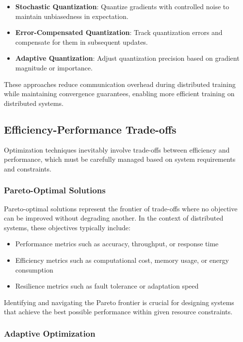 \documentclass{article}
\begin{document}
\begin{itemize}
    \item \textbf{Stochastic Quantization}: Quantize gradients with controlled noise to maintain unbiasedness in expectation.
    
    \item \textbf{Error-Compensated Quantization}: Track quantization errors and compensate for them in subsequent updates.
    
    \item \textbf{Adaptive Quantization}: Adjust quantization precision based on gradient magnitude or importance.
\end{itemize}

These approaches reduce communication overhead during distributed training while maintaining convergence guarantees, enabling more efficient training on distributed systems.

\subsection{Efficiency-Performance Trade-offs}

Optimization techniques inevitably involve trade-offs between efficiency and performance, which must be carefully managed based on system requirements and constraints.

\subsubsection{Pareto-Optimal Solutions}

Pareto-optimal solutions represent the frontier of trade-offs where no objective can be improved without degrading another. In the context of distributed systems, these objectives typically include:

\begin{itemize}
    \item Performance metrics such as accuracy, throughput, or response time
    \item Efficiency metrics such as computational cost, memory usage, or energy consumption
    \item Resilience metrics such as fault tolerance or adaptation speed
\end{itemize}

Identifying and navigating the Pareto frontier is crucial for designing systems that achieve the best possible performance within given resource constraints.

\subsubsection{Adaptive Optimization}
\end{document}
